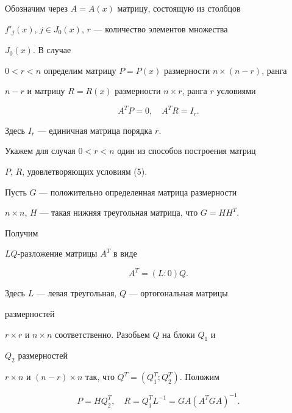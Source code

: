 Обозначим через $A=A(x)$ матрицу, состоящую из столбцов 


$f'_j(x)$, $j\in J_0(x)$, $r$ --- количество элементов множества 


$J_0(x)$. В случае 


$0<r<n$ определим матрицу $P=P(x)$ размерности $n\times(n-r)$, ранга 


$n-r$ и матрицу $R=R(x)$ размерности $n\times r$, ранга $r$ условиями 


\begin{equation} 


A^T P=0,\quad A^T R=I_r. 


\end{equation} 


Здесь $I_r$ --- единичная матрица порядка $r$. 


 


Укажем для случая $0<r<n$ один из способов построения матриц 


$P$, $R$, удовлетворяющих условиям (5). 


 


Пусть $G$ --- положительно определенная матрица размерности 


$n\times n$, $H$ --- такая нижняя треугольная матрица, что $G=HH^T$. 


Получим 


$LQ$-разложение матрицы $A^T$ в виде 


\begin{equation} 


A^T=(L:0)Q.


\end{equation} 


Здесь $L$ --- левая треугольная, $Q$ --- ортогональная матрицы 


размерностей 


$r\times r$ и $n\times n$ соответственно. Разобьем $Q$ на блоки $Q_1$ и 


$Q_2$ размерностей 


$r\times n$ и $(n-r)\times n$ так, что $Q^T=(Q^T_1;Q^T_2)$. Положим 


\begin{equation} 


P=H Q^T_2,\quad R=Q^T_1L^{-1}=G A(A^T G A)^{-1}. 


\end{equation} 


 


